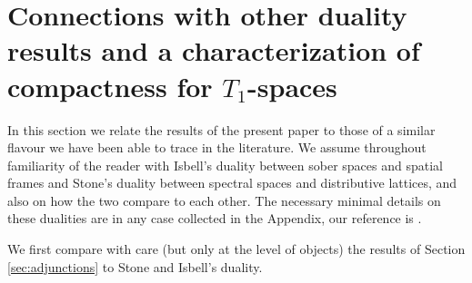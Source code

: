 \documentclass{article}
\newcommand{\opencorn}[2]{\mathcal{N}^{\mathsf{W}(#1)}_{#2}}
\newcommand{\closedcorn}[2]{\mathcal{C}^{\mathsf{W}(#1)}_{#2}}
\theoremstyle{plain}
\theoremstyle{definition}
\newtheorem{definition}[theorem]{Definition}
\theoremstyle{remark}
\newcommand{\0}{\mathbbm 0}
\newcommand{\1}{\mathbbm 1}
\newcommand{\2}{\mathbbm 2}
\begin{document}
%
%
%
%
%
%
%
%
%
%

\section{Connections with other duality results and a characterization of compactness for $T_1$-spaces}
\label{sec:relation with pre-existence literature}

In this section we relate the results of the present paper to those of a similar flavour we have been able to trace in the literature. We assume throughout familiarity of the reader with Isbell's duality between sober spaces and spatial frames and Stone's duality between spectral spaces and distributive lattices, and also on how the two compare to each other. The necessary minimal details on these dualities are in any case collected in the Appendix, our reference is \cite[Chapter 6]{gehrke2024topological}. %

We first compare with care (but only at the level of objects) the results of Section \ref{sec:adjunctions} to Stone and Isbell's duality. 
\end{document}
